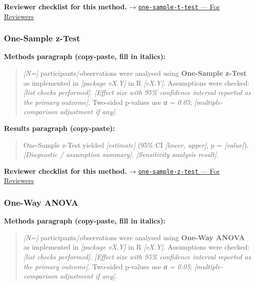 \documentclass[
]{article}
\begin{document}
\textbf{Reviewer checklist for this method.} →
\href{../chapters/04-inferential/one-sample-t-test.Rmd\#for-reviewers}{\texttt{one-sample-t-test}
--- For Reviewers}

\subsubsection{One-Sample z-Test}\label{one-sample-z-test}

\textbf{Methods paragraph (copy-paste, fill in italics):}

\begin{quote}
\emph{{[}N={]}} participants/observations were analysed using
\textbf{One-Sample z-Test} as implemented in \emph{{[}package vX.Y{]}}
in R \emph{{[}vX.Y{]}}. Assumptions were checked: \emph{{[}list checks
performed{]}}. \emph{{[}Effect size with 95\% confidence interval
reported as the primary outcome{]}}. Two-sided p-values use \emph{α =
0.05}; \emph{{[}multiple-comparison adjustment if any{]}}.
\end{quote}

\textbf{Results paragraph (copy-paste):}

\begin{quote}
One-Sample z-Test yielded \emph{{[}estimate{]}} (95\% CI \emph{{[}lower,
upper{]}}, p = \emph{{[}value{]}}). \emph{{[}Diagnostic / assumption
summary{]}}. \emph{{[}Sensitivity analysis result{]}}.
\end{quote}

\textbf{Reviewer checklist for this method.} →
\href{../chapters/04-inferential/one-sample-z-test.Rmd\#for-reviewers}{\texttt{one-sample-z-test}
--- For Reviewers}

\subsubsection{One-Way ANOVA}\label{one-way-anova}

\textbf{Methods paragraph (copy-paste, fill in italics):}

\begin{quote}
\emph{{[}N={]}} participants/observations were analysed using
\textbf{One-Way ANOVA} as implemented in \emph{{[}package vX.Y{]}} in R
\emph{{[}vX.Y{]}}. Assumptions were checked: \emph{{[}list checks
performed{]}}. \emph{{[}Effect size with 95\% confidence interval
reported as the primary outcome{]}}. Two-sided p-values use \emph{α =
0.05}; \emph{{[}multiple-comparison adjustment if any{]}}.
\end{quote}
\end{document}
